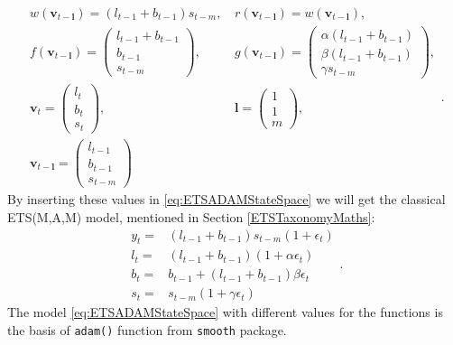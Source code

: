 \documentclass[]{book}
\theoremstyle{definition}
\theoremstyle{definition}
\theoremstyle{definition}
\theoremstyle{definition}
\theoremstyle{remark}
\begin{document}
\begin{equation*}
  \begin{aligned}
    w(\mathbf{v}_{t-\mathbf{l}}) = (l_{t-1}+b_{t-1}) s_{t-m}\text{, } &
    r(\mathbf{v}_{t-\mathbf{l}}) = w(\mathbf{v}_{t-\mathbf{l}}), \\
    f(\mathbf{v}_{t-\mathbf{l}}) = \begin{pmatrix} l_{t-1} + b_{t-1} \\ b_{t-1} \\ s_{t-m} \end{pmatrix}\text{, } &
    g(\mathbf{v}_{t-\mathbf{l}}) = \begin{pmatrix} \alpha (l_{t-1} + b_{t-1}) \\ \beta (l_{t-1} + b_{t-1}) \\ \gamma s_{t-m} \end{pmatrix}, \\
    \mathbf{v}_{t} = \begin{pmatrix} l_t \\ b_t \\ s_t \end{pmatrix}\text{, } &
    \mathbf{l} = \begin{pmatrix} 1 \\ 1 \\ m \end{pmatrix}, \\
    \mathbf{v}_{t-\mathbf{l}} = \begin{pmatrix} l_{t-1} \\ b_{t-1} \\ s_{t-m} \end{pmatrix}
  \end{aligned}.
\end{equation*}
By inserting these values in \eqref{eq:ETSADAMStateSpace} we will get the classical ETS(M,A,M) model, mentioned in Section \ref{ETSTaxonomyMaths}:
\begin{equation}
  \begin{aligned}
    y_{t} = & (l_{t-1} + b_{t-1}) s_{t-m}(1 + \epsilon_t) \\
    l_t = & (l_{t-1} + b_{t-1})(1 + \alpha \epsilon_t) \\
    b_t = & b_{t-1} + (l_{t-1} + b_{t-1}) \beta \epsilon_t \\
    s_t = & s_{t-m} (1 + \gamma \epsilon_t) 
  \end{aligned}.
  \label{eq:ETSADAMMAM}
\end{equation}
The model \eqref{eq:ETSADAMStateSpace} with different values for the functions is the basis of \texttt{adam()} function from \texttt{smooth} package.
\end{document}
